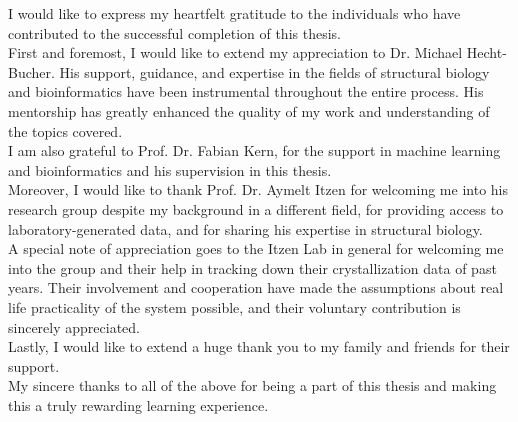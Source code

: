 \documentclass[
11pt, %
english, %
singlespacing, %
headsepline, %
]{MasterThesis} %
\begin{document}
\begin{acknowledgements}
\addchaptertocentry{\acknowledgementname}
I would like to express my heartfelt gratitude to the individuals who have contributed to the successful completion of this thesis.\\
First and foremost, I would like to extend my appreciation to Dr. Michael Hecht-Bucher.  His support, guidance, and expertise in the fields of structural biology and bioinformatics have been instrumental throughout the entire process. His mentorship has greatly enhanced the quality of my work and understanding of the topics covered.\\
I am also grateful to Prof. Dr. Fabian Kern, for the support in machine learning and bioinformatics and his supervision in this thesis. \\
Moreover, I would like to thank Prof. Dr. Aymelt Itzen for welcoming me into his research group despite my background in a different field, for providing access to laboratory-generated data, and for sharing his expertise in structural biology. \\
A special note of appreciation goes to the Itzen Lab in general for welcoming me into the group and their help in tracking down their crystallization data of past years. Their involvement and cooperation have made the assumptions about real life practicality of the system possible, and their voluntary contribution is sincerely appreciated.\\
Lastly, I would like to extend a huge thank you to my family and friends for their support. \\
My sincere thanks to all of the above for being a part of this thesis and making this a truly rewarding learning experience.\\

\end{acknowledgements}



\tableofcontents %

\listoffigures %

\listoftables %

\printglossary[type=\acronymtype,title={List of Acronyms}]
\end{document}
